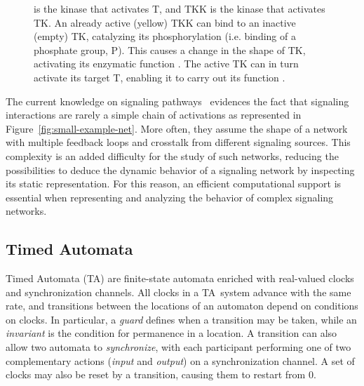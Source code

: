 \documentclass{llncs}
\newcommand{\ta}{Timed Automaton}
\newcommand{\tas}{Timed Automata}
\begin{document}
\begin{figure}[htbp]
{is the kinase that activates {\sf T}, and {\sf TKK} is the kinase that activates {\sf TK}.
{\bf\protect{}} An already active (yellow) {\sf TKK} can bind to
an inactive (empty) {\sf TK}, catalyzing its phosphorylation (i.e. binding of a phosphate group, {\sf P}).
This causes a change in the shape of {\sf TK}, activating its enzymatic function {\bf\protect{}}.
The active {\sf TK} can in turn activate its target {\sf T}, enabling it to carry out its function {\bf\protect{}}.
}\label{fig:small-example-biology}
\end{figure}


The current knowledge on signaling pathways~\cite{kegg,phosphosite} evidences the fact
that signaling interactions are rarely a simple chain of activations as represented in Figure~\ref{fig:small-example-net}.
More often, they assume the shape of a network with multiple feedback loops and crosstalk from different signaling sources.
This complexity is an added difficulty for the study of such networks, reducing the possibilities
to deduce the dynamic behavior of a signaling network by inspecting its static representation.
For this reason, an efficient computational support is essential when representing and analyzing the behavior
of complex signaling networks.


\subsection{\tas}\label{sec:TA}
\renewcommand{\ta}{TA}
\renewcommand{\tas}{TA}
Timed Automata (\tas) are finite-state automata enriched with real-valued clocks
and synchronization channels. All clocks in a \tas\ system advance with the same rate,
and transitions between the locations of an automaton
depend on conditions on clocks. In particular, a \emph{guard} defines when a transition
may be taken, while an \emph{invariant} is the condition for permanence in a location.
A transition can also allow two automata to \emph{synchronize},
with each participant performing one of two complementary actions (\emph{input} and \emph{output})
on a synchronization channel. A set of clocks may also be reset by a transition, causing them to restart from 0.
\end{document}
